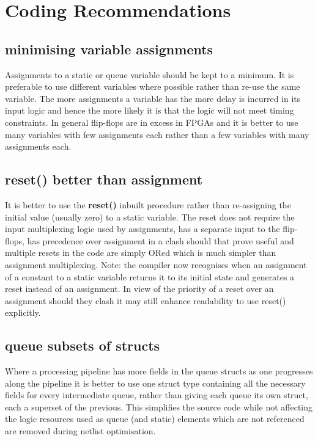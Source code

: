 \pagebreak

\chapter{Coding Recommendations}


    \section{minimising variable assignments}

        Assignments to a static or queue variable should be kept to a minimum. It
        is preferable to use different variables where possible rather than
        re-use the same variable. The more assignments a variable has the more
        delay is incurred in its input logic and hence the more likely it is
        that the logic will not meet timing constraints. In general flip-flops
        are in excess in FPGAs and it is better to use many variables with few
        assignments each rather than a few variables with many assignments each.
    
    \section{reset() better than assignment}

        It is better to use the {\bf reset()} inbuilt procedure rather than
        re-assigning the initial value (usually zero) to a static variable. The
        reset does not require the input multiplexing logic used by
        assignments, has a separate input to the flip-flops, has precedence
        over assignment in a clash should that prove useful and multiple
        resets in the code are simply ORed which is much simpler than
        assignment multiplexing. Note: the compiler now recognises when
        an assignment of a constant to a static variable returns it to its
        initial state and generates a reset instead of an assignment. In view
        of the priority of a reset over an assignment should they clash it may
        still enhance readability to use reset() explicitly.
    
    \section{queue subsets of structs}
    
        Where a processing pipeline has more fields in the queue structs as one
        progresses along the pipeline it is better to use one struct type
        containing all the necessary fields for every intermediate queue, rather
        than giving each queue its own struct, each a superset of the previous.
        This simplifies the source code while not affecting the logic resources
        used as queue (and static) elements which are not referenced are removed
        during netlist optimisation.
    
